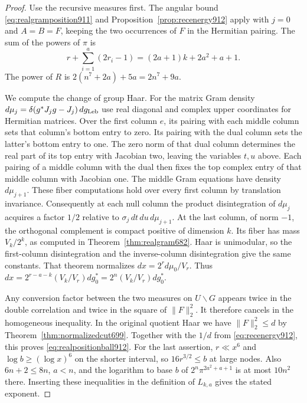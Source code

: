 \documentclass[a4paper,11pt]{article}
\theoremstyle{definition}
\theoremstyle{remark}
\numberwithin{equation}{section}
\begin{document}
\begin{proof}
Use the recursive measures first. The angular bound
\eqref{eq:realgramposition911} and Proposition~\ref{prop:recenergy912}
apply with \(j=0\) and \(A=B=F\), keeping the two occurrences
of \(F\) in the Hermitian pairing. The sum of the powers of
\(\pi\) is
\[
    r+\sum_{i=1}^a(2r_i-1)=(2a+1)k+2a^2+a+1 .
\]
The power of \(R\) is \(2(n^7+2a)+5a=2n^7+9a\).

We compute the change of group Haar. For the matrix Gram
density \(d\mu_j=\delta(g^*J_jg-J_j)\,dg_{\rm Leb}\) use real
diagonal and complex upper coordinates for Hermitian matrices.
Over the first column \(e\), its pairing with each middle
column sets that column's bottom entry to zero. Its pairing
with the dual column sets the latter's bottom entry to one.
The zero norm of that dual column determines the real part
of its top entry with Jacobian two, leaving the variables
\(t,u\) above. Each pairing of a middle column with the dual
then fixes the top complex entry of that middle column
with Jacobian one. The middle Gram equations have density
\(d\mu_{j+1}\). These fiber computations hold over every
first column by translation invariance. Consequently at each
null column the product disintegration of \(d\mu_j\) acquires
a factor \(1/2\) relative to \(\sigma_j\,dt\,du\,d\mu_{j+1}\).
At the last column, of norm \(-1\), the orthogonal complement
is compact positive of dimension \(k\). Its fiber has mass
\(V_k/2^k\), as computed in Theorem~\ref{thm:realgram682}.
Haar is unimodular, so the first-column disintegration and
the inverse-column disintegration give the same constants.
That theorem normalizes \(dx=2^r d\mu_0/V_r\). Thus
\(dx=2^{r-a-k}(V_k/V_r)dg_0^*=2^n(V_k/V_r)dg_0^*\).

Any conversion factor between the two measures on
\(U\backslash G\) appears twice in the double correlation and
twice in the square of \(\|F\|_2^2\). It therefore cancels in
the homogeneous inequality. In the original quotient Haar we
have \(\|F\|_2^2\le d\) by Theorem~\ref{thm:normalizedcut699}.
Together with the \(1/d\) from \eqref{eq:recenergy912}, this
proves \eqref{eq:realpositionball912}. For the last assertion,
\(r\ll x^6\) and \(\log b\ge(\log x)^6\) on the shorter
interval, so \(16r^{3/2}\le b\) at large nodes. Also
\(6n+2\le 8n\), \(a<n\), and the logarithm to base \(b\)
of \(2^n\pi^{2a^2+a+1}\) is at most \(10n^2\) there.
Inserting these inequalities in the definition of \(L_{k,a}\)
gives the stated exponent.
\end{proof}
\end{document}
